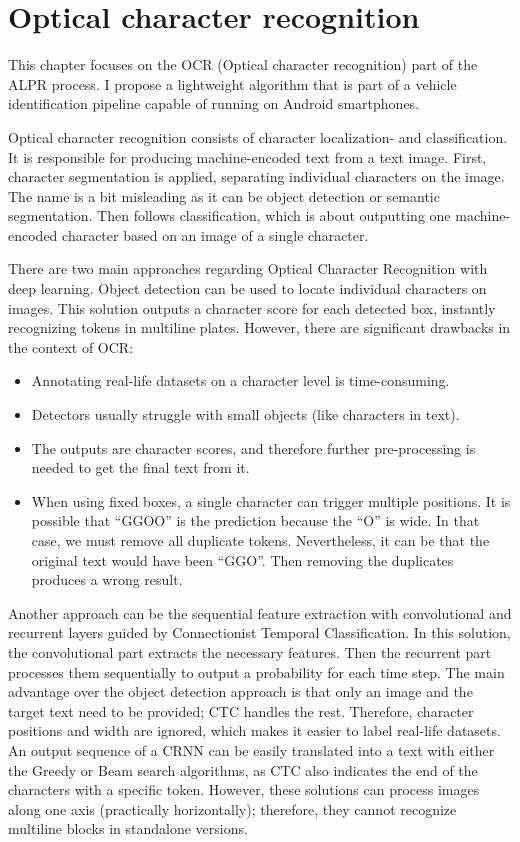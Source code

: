 \chapter{Optical character recognition}

This chapter focuses on the OCR (Optical character recognition) part of the ALPR process. I propose a lightweight algorithm that is part of a vehicle identification pipeline capable of running on Android smartphones.

Optical character recognition consists of character localization- and classification. It is responsible for producing machine-encoded text from a text image. First, character segmentation is applied, separating individual characters on the image. The name is a bit misleading as it can be object detection or semantic segmentation. Then follows classification, which is about outputting one machine-encoded character based on an image of a single character.

There are two main approaches regarding Optical Character Recognition with deep learning. Object detection can be used to locate individual characters on images. This solution outputs a character score for each detected box, instantly recognizing tokens in multiline plates. However, there are significant drawbacks in the context of OCR\cite{CTCexp}:

\begin{itemize}
  \item Annotating real-life datasets on a character level is time-consuming.
  \item Detectors usually struggle with small objects (like characters in text).
  \item The outputs are character scores, and therefore further pre-processing is needed to get the final text from it.
  \item When using fixed boxes, a single character can trigger multiple positions. It is possible that ``GGOO'' is the prediction because the ``O'' is wide. In that case, we must remove all duplicate tokens. Nevertheless, it can be that the original text would have been ``GGO''. Then removing the duplicates produces a wrong result.
\end{itemize}

Another approach can be the sequential feature extraction with convolutional and recurrent layers guided by Connectionist Temporal Classification\cite{CTC}. In this solution, the convolutional part extracts the necessary features. Then the recurrent part processes them sequentially to output a probability for each time step. The main advantage over the object detection approach is that only an image and the target text need to be provided; CTC handles the rest. Therefore, character positions and width are ignored, which makes it easier to label real-life datasets. An output sequence of a CRNN can be easily translated into a text with either the Greedy or Beam search algorithms, as CTC also indicates the end of the characters with a specific token. However, these solutions can process images along one axis (practically horizontally); therefore, they cannot recognize multiline blocks in standalone versions.

